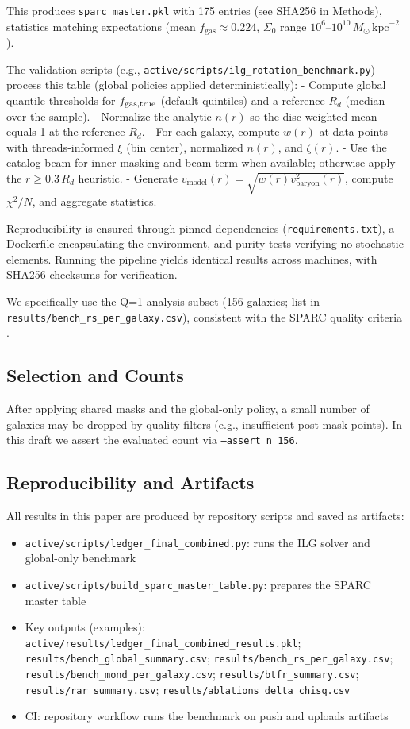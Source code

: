 \documentclass[fleqn,usenatbib]{mnras}
\begin{document}
This produces \texttt{sparc\_master.pkl} with 175 entries (see SHA256 in Methods), statistics matching expectations (mean $f_\mathrm{gas} \approx 0.224$, $\Sigma_0$ range $10^6$--$10^{10}\,M_\odot\,\mathrm{kpc}^{-2}$).

The validation scripts (e.g., \texttt{active/scripts/ilg\_rotation\_benchmark.py}) process this table (global policies applied deterministically):
- Compute global quantile thresholds for $f_{\rm gas,true}$ (default quintiles) and a reference $R_d$ (median over the sample).
- Normalize the analytic $n(r)$ so the disc-weighted mean equals 1 at the reference $R_d$.
- For each galaxy, compute $w(r)$ at data points with threads-informed $\xi$ (bin center), normalized $n(r)$, and $\zeta(r)$.
- Use the catalog beam for inner masking and beam term when available; otherwise apply the $r\ge0.3\,R_d$ heuristic.
- Generate $v_\mathrm{model}(r) = \sqrt{w(r) v_\mathrm{baryon}^2(r)}$, compute $\chi^2/N$, and aggregate statistics.

Reproducibility is ensured through pinned dependencies (\texttt{requirements.txt}), a Dockerfile encapsulating the environment, and purity tests verifying no stochastic elements. Running the pipeline yields identical results across machines, with SHA256 checksums for verification.

We specifically use the Q=1 analysis subset (156 galaxies; list in \texttt{results/bench\_rs\_per\_galaxy.csv}), consistent with the SPARC quality criteria \citep{lelli2016sparc}.

\subsection{Selection and Counts}
\noindent After applying shared masks and the global-only policy, a small number of galaxies may be dropped by quality filters (e.g., insufficient post-mask points). In this draft we assert the evaluated count via \texttt{--assert\_n 156}.

\subsection{Reproducibility and Artifacts}

All results in this paper are produced by repository scripts and saved as artifacts:
\begin{itemize}
  \item \texttt{active/scripts/ledger\_final\_combined.py}: runs the ILG solver and global-only benchmark
  \item \texttt{active/scripts/build\_sparc\_master\_table.py}: prepares the SPARC master table
  \item Key outputs (examples): \texttt{active/results/ledger\_final\_combined\_results.pkl}; \texttt{results/bench\_global\_summary.csv}; \texttt{results/bench\_rs\_per\_galaxy.csv}; \texttt{results/bench\_mond\_per\_galaxy.csv}; \texttt{results/btfr\_summary.csv}; \texttt{results/rar\_summary.csv}; \texttt{results/ablations\_delta\_chisq.csv}
  \item CI: repository workflow runs the benchmark on push and uploads artifacts
\end{itemize}
\end{document}
